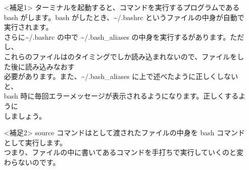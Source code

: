 \begin{itemize}
    \item[<補足1>] ターミナルを起動すると、コマンドを実行するプログラムである bash がします。bash がしたとき、\textasciitilde/.bashrc というファイルの中身が自動で実行されます。\\
    さらに\textasciitilde/.bashrc の中で \textasciitilde/.bash{\_}aliases の中身を実行するがあります。ただし、\\
    これらのファイルはのタイミングでしか読み込まれないので、ファイルをした後に読み込みなおす\\
    必要があります。また、\textasciitilde/.bash{\_}aliases に上で述べたように正しくしないと、\\
    bash 時に毎回エラーメッセージが表示されるようになります。正しくするように\\
    しましょう。
    \item[<補足2>] source コマンドはとして渡されたファイルの中身を bash コマンドとして実行します。\\
    つまり、ファイルの中に書いてあるコマンドを手打ちで実行していくのと変わらないのです。
\end{itemize}

\begin{tcolorbox}[title=\useOmetoi]
    \begin{enumerate}
    \end{enumerate}
\end{tcolorbox}
